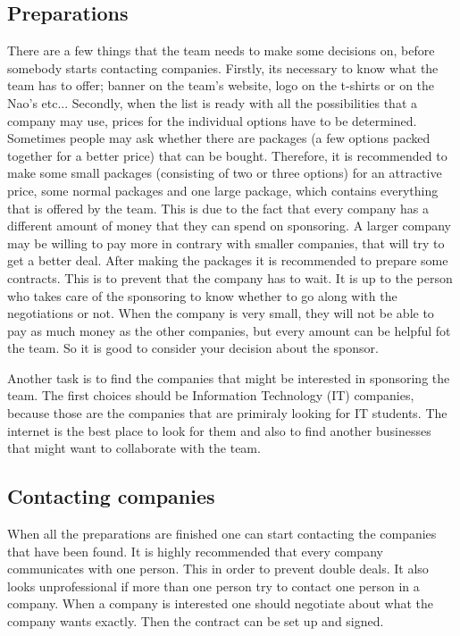 \documentclass[11pt,a4paper,oneside]{article}
\begin{document}
\subsection{Preparations}
There are a few things that the team needs to make some decisions on, before somebody starts contacting companies. Firstly, its necessary to know what the team has to offer; banner on the team's website, logo on the t-shirts or on the Nao's etc... Secondly, when the list is ready with all the possibilities that a company may use, prices for the individual options have to be determined. Sometimes people may ask whether there are packages (a few options packed together for a better price) that can be bought. Therefore, it is recommended to make some small packages (consisting of two or three options) for an attractive price, some normal packages and one large package, which contains everything that is offered by the team. This is due to the fact that every company has a different amount of money that they can spend on sponsoring. A larger company may be willing to pay more in contrary with smaller companies, that will try to get a better deal. After making the packages it is recommended to prepare some contracts. This is to prevent that the company has to wait.  It is up to the person who takes care of the sponsoring to know whether to go along with the negotiations or not. When the company is very small, they will not be able to pay as much money as the other companies, but every amount can be helpful fot the team. So it is good to consider your decision about the sponsor.

Another task is to find the companies that might be interested in sponsoring the team. The first choices should be Information Technology (IT) companies, because those are the companies that are primiraly looking for IT students. The internet is the best place to look for them and also to find another businesses that might want to collaborate with the team.

\subsection{Contacting companies}
When all the preparations are finished one can start contacting the companies that have been found. It is highly recommended that every company communicates with one person. This in order to prevent double deals. It also looks unprofessional if more than one person try to contact one person in a company. When a company is interested one should negotiate about what the company wants exactly. Then the contract can be set up and signed.
\end{document}
